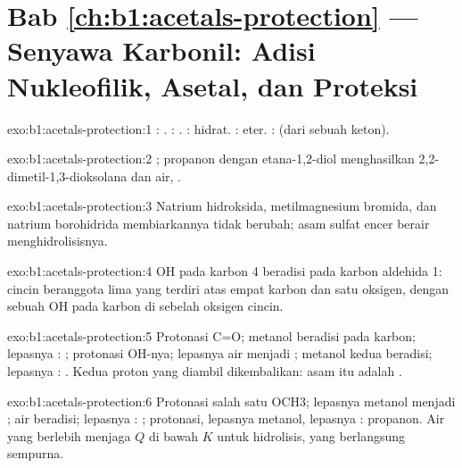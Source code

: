 \section*{Bab \ref{ch:b1:acetals-protection} --- Senyawa Karbonil: Adisi Nukleofilik, Asetal, dan Proteksi}

\begin{solution}{exo:b1:acetals-protection:1}
: . : .
: hidrat. : eter. :
 (dari sebuah keton).
\end{solution}

\begin{solution}{exo:b1:acetals-protection:2}
; propanon dengan
etana-1,2-diol menghasilkan 2,2-dimetil-1,3-dioksolana dan air,
.
\end{solution}

\begin{solution}{exo:b1:acetals-protection:3}
Natrium hidroksida, metilmagnesium bromida, dan natrium borohidrida
membiarkannya tidak berubah; asam sulfat encer berair menghidrolisisnya.
\end{solution}

\begin{solution}{exo:b1:acetals-protection:4}
OH pada karbon 4 beradisi pada karbon aldehida 1: cincin beranggota lima
yang terdiri atas empat karbon dan satu oksigen, dengan sebuah OH pada
karbon di sebelah oksigen cincin.
\end{solution}

\begin{solution}{exo:b1:acetals-protection:5}
Protonasi C=O; metanol beradisi pada karbon; lepasnya : ;
protonasi OH-nya; lepasnya air menjadi ; metanol kedua
beradisi; lepasnya : . Kedua proton yang diambil
dikembalikan: asam itu adalah .
\end{solution}

\begin{solution}{exo:b1:acetals-protection:6}
Protonasi salah satu OCH3; lepasnya metanol menjadi ;
air beradisi; lepasnya : ; protonasi, lepasnya metanol,
lepasnya : propanon. Air yang berlebih menjaga $Q$ di bawah $K$
untuk hidrolisis, yang berlangsung sempurna.
\end{solution}


